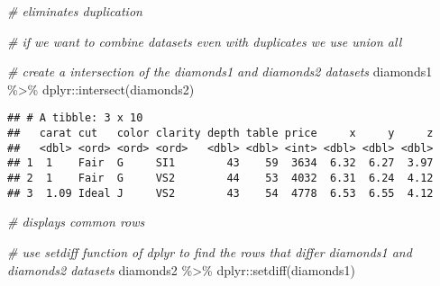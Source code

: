 \documentclass[
]{article}
\newenvironment{Shaded}{\begin{snugshade}}{\end{snugshade}}
\newcommand{\CommentTok}[1]{\textcolor[rgb]{0.56,0.35,0.01}{\textit{#1}}}
\newcommand{\FunctionTok}[1]{\textcolor[rgb]{0.00,0.00,0.00}{#1}}
\newcommand{\NormalTok}[1]{#1}
\newcommand{\SpecialCharTok}[1]{\textcolor[rgb]{0.00,0.00,0.00}{#1}}
\begin{document}
\begin{Shaded}
\begin{Highlighting}[]
\CommentTok{\# eliminates duplication}

\CommentTok{\# if we want to combine datasets even with duplicates we use union all}
\end{Highlighting}
\end{Shaded}

\begin{Shaded}
\begin{Highlighting}[]
\CommentTok{\# create a intersection of the diamonds1 and diamonds2 datasets}
\NormalTok{diamonds1 }\SpecialCharTok{\%\textgreater{}\%}
\NormalTok{  dplyr}\SpecialCharTok{::}\FunctionTok{intersect}\NormalTok{(diamonds2)}
\end{Highlighting}
\end{Shaded}

\begin{verbatim}
## # A tibble: 3 x 10
##   carat cut   color clarity depth table price     x     y     z
##   <dbl> <ord> <ord> <ord>   <dbl> <dbl> <int> <dbl> <dbl> <dbl>
## 1  1    Fair  G     SI1        43    59  3634  6.32  6.27  3.97
## 2  1    Fair  G     VS2        44    53  4032  6.31  6.24  4.12
## 3  1.09 Ideal J     VS2        43    54  4778  6.53  6.55  4.12
\end{verbatim}

\begin{Shaded}
\begin{Highlighting}[]
\CommentTok{\# displays common rows}
\end{Highlighting}
\end{Shaded}

\begin{Shaded}
\begin{Highlighting}[]
\CommentTok{\# use setdiff function of dplyr to find the rows that differ diamonds1 and diamonds2 datasets}
\NormalTok{diamonds2 }\SpecialCharTok{\%\textgreater{}\%}
\NormalTok{  dplyr}\SpecialCharTok{::}\FunctionTok{setdiff}\NormalTok{(diamonds1)}
\end{Highlighting}
\end{Shaded}
\end{document}
